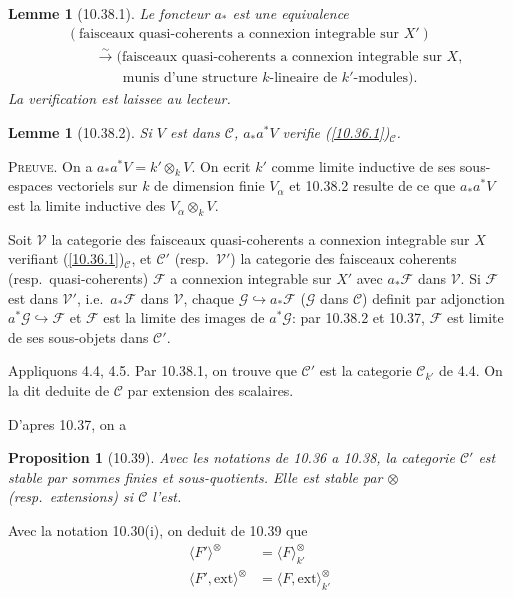 \documentclass[12pt,a4paper]{article}
\theoremstyle{plain}
\newtheorem{lemma}[theorem]{Lemme}
\newtheorem{proposition}[theorem]{Proposition}
\theoremstyle{definition}
\theoremstyle{remark}
\newcommand{\ext}{\mathrm{ext}}
\begin{document}
\begin{lemma}[10.38.1]
Le foncteur $a_*$ est une equivalence
\begin{align*}
&(\text{faisceaux quasi-coherents a connexion integrable sur } X') \\
&\qquad \xrightarrow{\sim} (\text{faisceaux quasi-coherents a connexion integrable sur } X, \\
&\qquad\qquad \text{munis d'une structure } k\text{-lineaire de } k'\text{-modules}).
\end{align*}
La verification est laissee au lecteur.
\end{lemma}

\begin{lemma}[10.38.2]
Si $V$ est dans $\mathcal{C}$, $a_* a^* V$ verifie (\ref{10.36.1})$_{\mathcal{C}}$.
\end{lemma}

\textsc{Preuve.} On a $a_* a^* V = k' \otimes_k V$. On ecrit $k'$ comme limite inductive de ses sous-espaces vectoriels sur $k$ de dimension finie $V_\alpha$ et 10.38.2 resulte de ce que $a_* a^* V$ est la limite inductive des $V_\alpha \otimes_k V$.

Soit $\mathcal{V}$ la categorie des faisceaux quasi-coherents a connexion integrable sur $X$ verifiant (\ref{10.36.1})$_{\mathcal{C}}$, et $\mathcal{C}'$ (resp.~$\mathcal{V}'$) la categorie des faisceaux coherents (resp.~quasi-coherents) $\mathcal{F}$ a connexion integrable sur $X'$ avec $a_* \mathcal{F}$ dans $\mathcal{V}$. Si $\mathcal{F}$ est dans $\mathcal{V}'$, i.e.~$a_* \mathcal{F}$ dans $\mathcal{V}$, chaque $\mathcal{G} \hookrightarrow a_* \mathcal{F}$ ($\mathcal{G}$ dans $\mathcal{C}$) definit par adjonction $a^* \mathcal{G} \hookrightarrow \mathcal{F}$ et $\mathcal{F}$ est la limite des images de $a^* \mathcal{G}$: par 10.38.2 et 10.37, $\mathcal{F}$ est limite de ses sous-objets dans $\mathcal{C}'$.

Appliquons 4.4, 4.5. Par 10.38.1, on trouve que $\mathcal{C}'$ est la categorie $\mathcal{C}_{k'}$ de 4.4. On la dit deduite de $\mathcal{C}$ par extension des scalaires.

D'apres 10.37, on a
\begin{proposition}[10.39]
Avec les notations de 10.36 a 10.38, la categorie $\mathcal{C}'$ est stable par sommes finies et sous-quotients. Elle est stable par $\otimes$ (resp.~extensions) si $\mathcal{C}$ l'est.
\end{proposition}

Avec la notation 10.30(i), on deduit de 10.39 que
\begin{align}
\langle F' \rangle^{\otimes} &= \langle F \rangle^{\otimes}_{k'} \label{10.39.1} \\
\langle F', \ext \rangle^{\otimes} &= \langle F, \ext \rangle^{\otimes}_{k'} \label{10.39.2}
\end{align}
\end{document}
